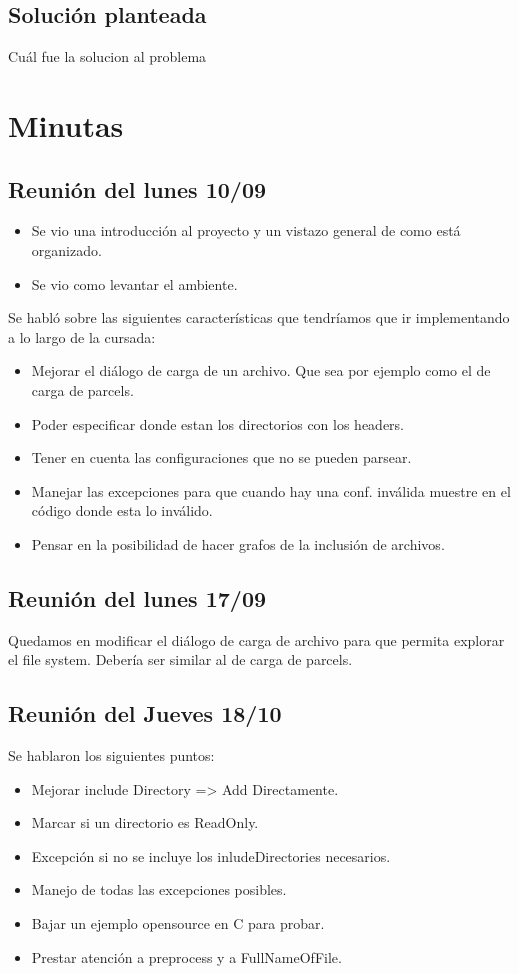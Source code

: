 \documentclass[a4paper,oneside,10pt]{article}
\begin{document}
\subsection{Soluci\'on planteada}
Cu\'al fue la solucion al problema

\section{Minutas}

\subsection{Reunión del lunes 10/09}
\begin{itemize}
  \item Se vio una introducción al proyecto y un vistazo general de como está organizado.
  \item Se vio como levantar el ambiente.
\end{itemize}

Se habló sobre las siguientes características que tendríamos que ir implementando a lo largo de la cursada:
\begin{itemize}
  \item Mejorar el diálogo de carga de un archivo. Que sea por ejemplo como el de carga de parcels.
  \item Poder especificar donde estan los directorios con los headers.
  \item Tener en cuenta las configuraciones que no se pueden parsear.
  \item Manejar las excepciones para que cuando hay una conf. inválida muestre en el código donde esta lo inválido.
  \item Pensar en la posibilidad de hacer grafos de la inclusión de archivos.
\end{itemize}

\subsection{Reunión del lunes 17/09}
Quedamos en modificar el diálogo de carga de archivo para que permita explorar el file system. Debería ser similar al de carga de parcels.

\subsection{Reunión del Jueves 18/10}
Se hablaron los siguientes puntos:
\begin{itemize}
 \item Mejorar include Directory => Add Directamente.
 \item Marcar si un directorio es ReadOnly.
 \item Excepción si no se incluye los inludeDirectories necesarios. 
 \item Manejo de todas las excepciones posibles.
 \item Bajar un ejemplo opensource en C para probar.
 \item Prestar atención a preprocess y a FullNameOfFile.
\end{itemize}
\end{document}
